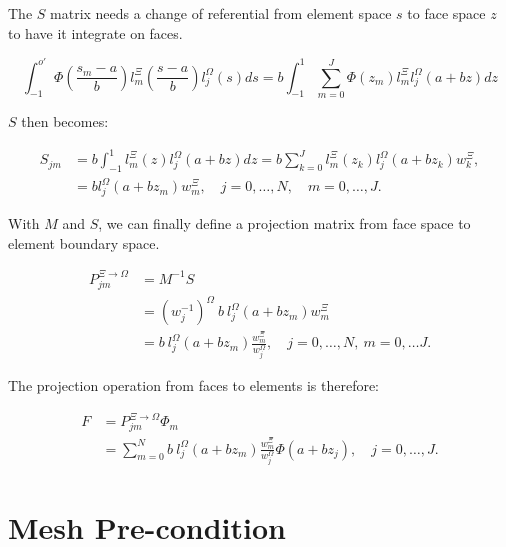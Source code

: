 \noindent
The \(S\) matrix needs a change of referential from element space \(s\) to face space \(z\) to have
it integrate on faces.

\begin{equation}
	\int_{-1}^{o'} \Phi(\frac{s_m -a}{b})l_m^\Xi(\frac{s -a}{b}) l_j^\Omega(s)ds
	= b\int_{-1}^{1}\sum_{m = 0}^{J} \Phi(z_m)l_m^{\Xi}l_j^{\Omega}(a + bz)dz
\end{equation}

\noindent
\(S\) then becomes: 

\begin{equation}
	\begin{aligned}
		S_{jm} &=  b\int_{-1}^{1}l_m^{\Xi}(z)l_j^{\Omega}(a + bz)dz
		= b\sum_{k = 0}^{J}l_m^{\Xi}(z_k)l_j^{\Omega}(a +b z_k)w_k^{\Xi}, \\
		&= b l_j^{\Omega}(a + bz_m)w_m^{\Xi}, \quad j = 0, \ldots, N, \quad m = 0, \ldots, J.
	\end{aligned}
\end{equation}

\noindent
With \(M\) and \(S\), we can finally define a projection matrix from face space to element boundary
space.

\begin{equation}
	\begin{aligned}
		P^{\Xi \rightarrow \Omega}_{jm} &= M^{-1}S \\
		&= {(w_j^{-1})}^{\Omega } \: b \: l_j^{\Omega }(a + bz_m)w_m^{\Xi}\\
		&= b \: l_j^{\Omega}(a + bz_m)\frac{w_m^{\Xi}}{w_j^{\Omega}}, \quad j = 0, \ldots, N, \: m = 0, \ldots J. 
	\end{aligned}
\end{equation} 

\noindent
The projection operation from faces to elements is therefore:

\begin{align} \label{projection_face_to_element}
	F &= P^{\Xi \rightarrow \Omega}_{jm} \Phi_m  \\
	&= \sum_{m = 0}^{N} b \: l_j^{\Omega}(a + bz_m)\frac{w_m^{\Xi}}{w_j^{\Omega}} \Phi (a + b z_j), \quad j = 0, \ldots, J.
\end{align}

\section{Mesh Pre-condition}\label{section:adaptive_mesh_refinement:pre_conditioning}

